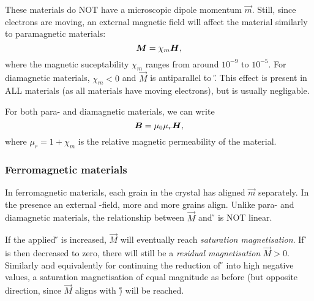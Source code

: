         These materials do NOT have a microscopic dipole momentum $\vec{m}$. Still, since electrons are moving, 
        an external magnetic field will affect the material similarly to paramagnetic materials:
        \begin{equation}
            \bm{M} = \chi_m\bm{H},
        \end{equation}
        where the magnetic suceptability $\chi_m$ ranges from around $10^{-9}$ to $10^{-5}$. 
        For diamagnetic materials, $\chi_m < 0$ and $\vec{M}$ is antiparallel to \H. 
        This effect is present in ALL materials (as all materials have moving electrons), but is usually negligable.
    
    For both para- and diamagnetic materials, we can write
    \begin{equation}
        \bm{B} = \mu_0 \mu_r \bm{H},
    \end{equation}
    where $\mu_r = 1+\chi_m$ is the relative magnetic permeability of the material.
    
    \subsubsection{Ferromagnetic materials}
        In ferromagnetic materials, each grain in the crystal has aligned $\vec{m}$ separately. 
        In the presence an external \B-field, more and more grains align. 
        Unlike para- and diamagnetic materials, the relationship between $\vec{M}$ and \H{} is NOT linear.

        If the applied \H{} is increased, $\vec{M}$ will eventually reach \textit{saturation magnetisation}. 
        If \H{} is then decreased to zero, there will still be a \textit{residual magnetisation} $\vec{M} > 0$. 
        Similarly and equivalently for continuing the reduction of \H{} into high negative values, 
        a saturation magnetisation of equal magnitude as before (but opposite direction, since $\vec{M}$ aligns with \H) will be reached.
